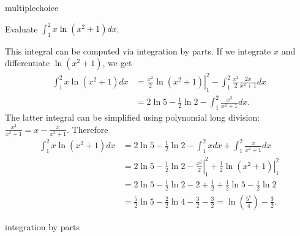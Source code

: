 \documentclass{ximera}
\begin{document}
\begin{question}[2017C.05]
\begin{type}
multiplechoice
\end{type}
Evaluate \(\displaystyle \int_1^2 x \ln (x^2 + 1) dx\).
\begin{multiplechoice}
\end{multiplechoice}
\begin{feedback}
This integral can be computed via integration by parts. If we integrate \(x\) and differentiate \(\ln (x^2+1)\), we get
\[\begin{aligned}
\int_1^2 x \ln (x^2+1) dx & = \left. \frac{x^2}{2} \ln (x^2+1) \right|_{1}^2 - \int_1^2 \frac{x^2}{2} \frac{2x}{x^2+1} dx \\
& = 2 \ln 5 - \frac{1}{2} \ln 2 - \int_1^2 \frac{x^3}{x^2+1} dx.
\end{aligned}\]
The latter integral can be simplified using polynomial long division: \(\displaystyle \frac{x^3}{x^2+1} = x - \frac{x}{x^2+1}\).
Therefore
\[\begin{aligned}
\int_1^2 x \ln (x^2+1) dx & = 2 \ln 5 - \frac{1}{2} \ln 2 - \int_1^2 x dx + \int_1^2 \frac{x}{x^2+1} dx \\
& = 2 \ln 5 - \frac{1}{2} \ln 2 - \left. \frac{x^2}{2} \right|_1^2 + \left. \frac{1}{2} \ln (x^2+1) \right|_1^2 \\
& = 2 \ln 5 - \frac{1}{2} \ln 2 - 2 + \frac{1}{2} + \frac{1}{2} \ln 5 - \frac{1}{2} \ln 2 \\
& = \frac{5}{2} \ln 5 - \frac{2}{2} \ln 4 - \frac{3}{2} - \frac{3}{2} = \ln \left( \frac{5^5}{4} \right) - \frac{3}{2}.
\end{aligned}\]
\end{feedback}
\begin{keywords}
integration by parts
\end{keywords}
\end{question}
\end{document}
